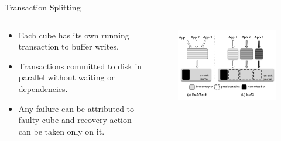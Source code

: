 \documentclass[aspectratio=169]{beamer}
\newcommand{\bi}{\begin{itemize}}
\newcommand{\ei}{\end{itemize}}
\begin{document}
\begin{frame}{Transaction Splitting}
    \begin{columns}[T]
        \begin{column}{0.5\textwidth}
            \bi
        \item Each cube has its own running transaction to buffer writes.
        \item Transactions committed to disk in parallel without waiting or
            dependencies.
        \item Any failure can be attributed to faulty cube and recovery action can be
            taken only on it.
            \ei
        \end{column}
        \pause
        \hspace{-2cm}\begin{column}{0.2\textwidth}
            \begin{figure}
                \includegraphics[scale=0.3]{./figures/fig7.png}
            \end{figure}
        \end{column}
    \end{columns}
\end{frame}
\end{document}
